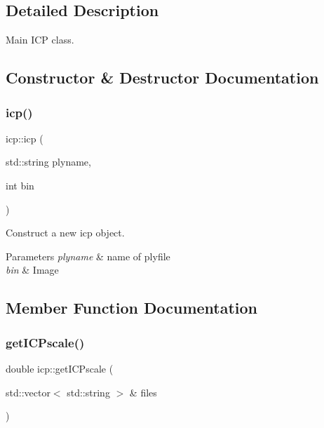 \subsection{Detailed Description}
Main I\+CP class. 

\subsection{Constructor \& Destructor Documentation}
\mbox{\label{classicp_a16dfbc3ddb18a613cfd4fb8861d0c16a}} 
\subsubsection{\texorpdfstring{icp()}{icp()}}
{\footnotesize\ttfamily icp\+::icp (\begin{DoxyParamCaption}\item[{std\+::string}]{plyname,  }\item[{int}]{bin }\end{DoxyParamCaption})}



Construct a new icp object. 


\begin{DoxyParams}{Parameters}
{\em plyname} & name of plyfile \\
\hline
{\em bin} & Image \\
\hline
\end{DoxyParams}


\subsection{Member Function Documentation}
\mbox{\label{classicp_af5adbefb80bcd764306af7361e2a532a}} 
\subsubsection{\texorpdfstring{get\+I\+C\+Pscale()}{getICPscale()}}
{\footnotesize\ttfamily double icp\+::get\+I\+C\+Pscale (\begin{DoxyParamCaption}\item[{std\+::vector$<$ std\+::string $>$ \&}]{files }\end{DoxyParamCaption})}



